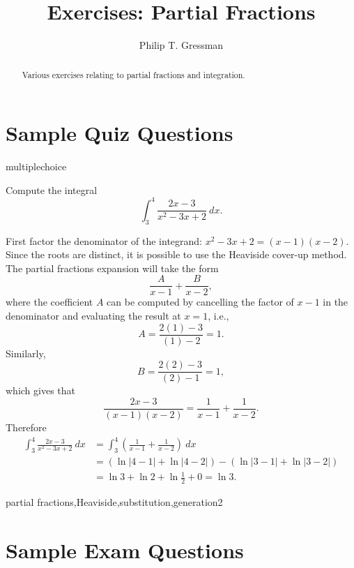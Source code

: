 \documentclass{ximera}
\title{Exercises: Partial Fractions}
\author{Philip T. Gressman}
\begin{document}
\begin{abstract}
Various exercises relating to partial fractions and integration.
\end{abstract}
\maketitle

\section*{Sample Quiz Questions}

\begin{question}[PartialFracHeav001v2]
\begin{type}
multiplechoice
\end{type}
Compute the integral
\[\int_{3}^{4}\frac{2x-3}{x^2-3x+2}~dx.\]
\begin{multiplechoice}
\end{multiplechoice}
\begin{feedback}
First factor the denominator of the integrand: \(x^2-3x+2 = (x-1)(x-2)\). Since the roots are distinct, it is possible to use the Heaviside cover-up method.  The partial fractions expansion will take the form \[\frac{A}{x-1} + \frac{B}{x-2}, \] where the coefficient \(A\) can be computed by cancelling the factor of \(x-1\) in the denominator and evaluating the result at \(x = 1\), i.e., \[A = \frac{2(1)-3}{(1)-2} = 1. \] Similarly, \[B = \frac{2(2)-3}{(2)-1} = 1,\] which gives that \[\frac{2x-3}{(x-1)(x-2)} = \frac{1}{x-1} + \frac{1}{x-2}. \] Therefore
\[ \begin{aligned} 
\int_{3}^{4}\frac{2x-3}{x^2-3x+2}~dx & = \int_{3}^{4}\left(\frac{1}{x-1} + \frac{1}{x-2}\right)~dx \\
 & = \left(\ln |4-1| + \ln |4-2| \right) - \left(\ln |3-1| + \ln |3-2| \right)\\
 & = \ln 3 + \ln 2 + \ln \frac{1}{2} + 0 = \ln 3.\end{aligned}\]
\end{feedback}
\begin{keywords}
partial fractions,Heaviside,substitution,generation2
\end{keywords}
\end{question}

\section*{Sample Exam Questions}
\end{document}
